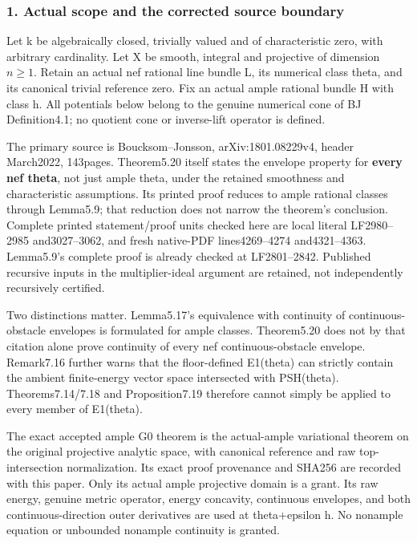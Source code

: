 \documentclass[
]{article}
\begin{document}
\subsubsection{1. Actual scope and the corrected source
boundary}\label{actual-scope-and-the-corrected-source-boundary}

Let k be algebraically closed, trivially valued and of characteristic
zero, with arbitrary cardinality. Let X be smooth, integral and
projective of dimension \(n\geq1\). Retain an actual nef rational line
bundle L, its numerical class theta, and its canonical trivial reference
zero. Fix an actual ample rational bundle H with class h. All potentials
below belong to the genuine numerical cone of BJ Definition4.1; no
quotient cone or inverse-lift operator is defined.

The primary source is Boucksom--Jonsson, arXiv:1801.08229v4, header
March2022, 143pages. Theorem5.20 itself states the envelope property for
\textbf{every nef theta}, not just ample theta, under the retained
smoothness and characteristic assumptions. Its printed proof reduces to
ample rational classes through Lemma5.9; that reduction does not narrow
the theorem's conclusion. Complete printed statement/proof units checked
here are local literal LF2980--2985 and3027--3062, and fresh native-PDF
lines4269--4274 and4321--4363. Lemma5.9's complete proof is already
checked at LF2801--2842. Published recursive inputs in the
multiplier-ideal argument are retained, not independently recursively
certified.

Two distinctions matter. Lemma5.17's equivalence with continuity of
continuous-obstacle envelopes is formulated for ample classes.
Theorem5.20 does not by that citation alone prove continuity of every
nef continuous-obstacle envelope. Remark7.16 further warns that the
floor-defined E1(theta) can strictly contain the ambient finite-energy
vector space intersected with PSH(theta). Theorems7.14/7.18 and
Proposition7.19 therefore cannot simply be applied to every member of
E1(theta).

The exact accepted ample G0 theorem is the actual-ample variational
theorem on the original projective analytic space, with canonical
reference and raw top-intersection normalization. Its exact proof
provenance and SHA256 are recorded with this paper. Only its actual
ample projective domain is a grant. Its raw energy, genuine metric
operator, energy concavity, continuous envelopes, and both
continuous-direction outer derivatives are used at theta+epsilon h. No
nonample equation or unbounded nonample continuity is granted.
\end{document}

